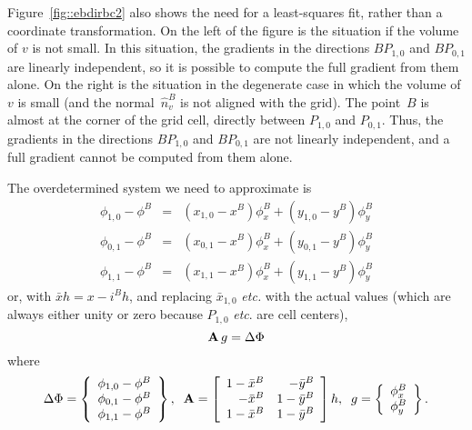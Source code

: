  Figure~\ref{fig::ebdirbc2} also shows the need for a least-squares fit,
 rather than a coordinate transformation.  On the left of the figure is
 the situation if the volume of $v$ is not small.  In this situation,
 the gradients in the directions $B\!P_{1,0}$ and $B\!P_{0,1}$ are linearly
 independent, so it is possible to compute the full gradient from them
 alone.  On the right is the situation in the degenerate case in which
 the volume of $v$ is small (and the normal~$\widehat{n}^B_v$ is not
 aligned with the grid).  The point~$B$ is almost at the corner of the
 grid cell, directly between $P_{1,0}$ and $P_{0,1}$.  Thus, the
 gradients in the directions $B\!P_{1,0}$ and $B\!P_{0,1}$ are not linearly
 independent, and a full gradient cannot be computed from them alone.
 
 The overdetermined system we need to approximate is
 \begin{eqnarray}
 \phi_{1,0} - \phi^B &=& 
 \left( x_{1,0} - x^B \right) \phi^B_x 
 +
 \left( y_{1,0} - y^B \right) \phi^B_y 
 \nonumber \\
 \phi_{0,1} - \phi^B &=& 
 \left( x_{0,1} - x^B \right) \phi^B_x 
 +
 \left( y_{0,1} - y^B \right) \phi^B_y 
 \nonumber \\
 \phi_{1,1} - \phi^B &=& 
 \left( x_{1,1} - x^B \right) \phi^B_x 
 +
 \left( y_{1,1} - y^B \right) \phi^B_y
 \end{eqnarray}
 or, with $\bar{x} h = x - i^Bh$, and replacing $\bar{x}_{1,0}$ {\em
 etc.} with the actual values (which are always either unity or zero
 because $P_{1,0}$ {\em etc}. are cell centers),
 \begin{equation}
 {\rm\bf A} \, {\boldmath g} = {\boldmath \Delta \Phi}
 \label{eqn::3e2u}
 \end{equation}
 where
 \begin{equation}
 {\boldmath \Delta \Phi} = \left\{ \begin{array}{c}
 \phi_{1,0} - \phi^B \\
 \phi_{0,1} - \phi^B \\
 \phi_{1,1} - \phi^B 
 \end{array} \right\}
 , \;\;
 {\rm \bf A} = \left[ \begin{array}{rr}
 1 - \bar{x}^B  &    - \bar{y}^B \\
   - \bar{x}^B  &  1 - \bar{y}^B \\
 1 - \bar{x}^B  &  1 - \bar{y}^B 
 \end{array} \right] h
 , \;\;
 {\boldmath g} = \left\{ \begin{array}{c}
 \phi^B_x \\
 \phi^B_y
 \end{array} \right\}
 .
 \end{equation}
